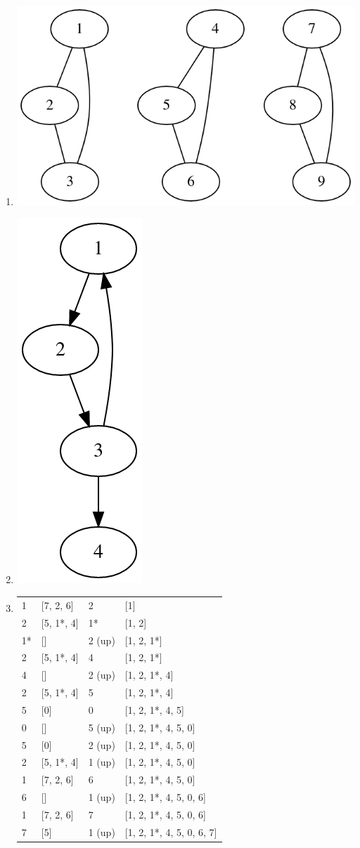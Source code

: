 \documentclass{article}
\begin{document}
\begin{enumerate}[label=(\arabic*)]
    \item \phantom{}
    \begin{center}
        \includegraphics[width=.5\textwidth]{graph3.png}
    \end{center}

    \item \phantom{}
    \begin{center}
        \includegraphics[width=.15\textwidth]{graph4.png}
    \end{center}

    \item \phantom{}
    \begin{center}        
        \begin{tabular}{l l l l}
            1 & [7, 2, 6] & 2 & [1] \\
            2 & [5, 1*, 4] & 1* & [1, 2] \\
            1* & [] & 2 (up) & [1, 2, 1*] \\
            2 & [5, 1*, 4] & 4 & [1, 2, 1*] \\
            4 & [] & 2 (up) & [1, 2, 1*, 4] \\
            2 & [5, 1*, 4] & 5 & [1, 2, 1*, 4] \\
            5 & [0] & 0 & [1, 2, 1*, 4, 5] \\
            0 & [] & 5 (up) & [1, 2, 1*, 4, 5, 0] \\
            5 & [0] & 2 (up) & [1, 2, 1*, 4, 5, 0] \\
            2 & [5, 1*, 4] & 1 (up) & [1, 2, 1*, 4, 5, 0] \\
            1 & [7, 2, 6] & 6 & [1, 2, 1*, 4, 5, 0] \\
            6 & [] & 1 (up) & [1, 2, 1*, 4, 5, 0, 6] \\
            1 & [7, 2, 6] & 7 & [1, 2, 1*, 4, 5, 0, 6] \\
            7 & [5] & 1 (up) & [1, 2, 1*, 4, 5, 0, 6, 7] \\
        \end{tabular}
    \end{center}
\end{enumerate}
\end{document}
